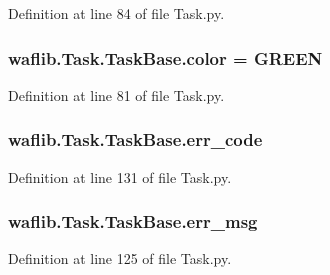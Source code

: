 Definition at line 84 of file Task.\+py.

\subsubsection[{\texorpdfstring{color}{color}}]{ waflib.\+Task.\+Task\+Base.\+color = \textquotesingle{}G\+R\+E\+EN\textquotesingle{}\hspace{0.3cm}{\ttfamily [static]}}\hypertarget{classwaflib_1_1_task_1_1_task_base_ab1c68e73ff83a2f7c23eea580e5180b6}{}\label{classwaflib_1_1_task_1_1_task_base_ab1c68e73ff83a2f7c23eea580e5180b6}


Definition at line 81 of file Task.\+py.

\subsubsection[{\texorpdfstring{err\+\_\+code}{err_code}}]{\setlength{\rightskip}{0pt plus 5cm}waflib.\+Task.\+Task\+Base.\+err\+\_\+code}\hypertarget{classwaflib_1_1_task_1_1_task_base_a23814f6cff42ad3192598255a871a1bb}{}\label{classwaflib_1_1_task_1_1_task_base_a23814f6cff42ad3192598255a871a1bb}


Definition at line 131 of file Task.\+py.

\subsubsection[{\texorpdfstring{err\+\_\+msg}{err_msg}}]{\setlength{\rightskip}{0pt plus 5cm}waflib.\+Task.\+Task\+Base.\+err\+\_\+msg}\hypertarget{classwaflib_1_1_task_1_1_task_base_a6076a4b9edbad72479b2b98ab064d536}{}\label{classwaflib_1_1_task_1_1_task_base_a6076a4b9edbad72479b2b98ab064d536}


Definition at line 125 of file Task.\+py.

